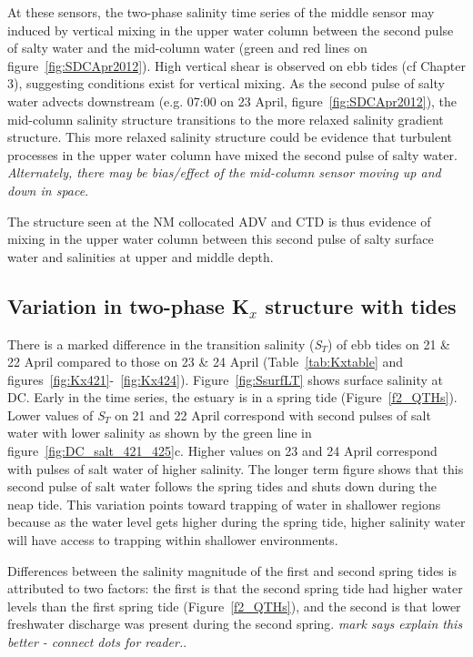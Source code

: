 At these sensors, the two-phase salinity time series of the middle sensor may induced by vertical mixing in the upper water column between the second pulse of salty water and the mid-column water (green and red lines on figure~\ref{fig:SDCApr2012}). High vertical shear is observed on ebb tides (cf Chapter 3), suggesting conditions exist for vertical mixing. As the second pulse of salty water advects downstream (e.g. 07:00 on 23 April, figure~\ref{fig:SDCApr2012}), the mid-column salinity structure transitions to the more relaxed salinity gradient structure. This more relaxed salinity structure could be evidence that turbulent processes in the upper water column have mixed the second pulse of salty water.  \emph{Alternately, there may be bias/effect of the mid-column sensor moving up and down in space}.  

The structure seen at the NM collocated ADV and CTD is thus evidence of mixing in the upper water column between this second pulse of salty surface water and salinities at upper and middle depth.

\subsection{Variation in two-phase K$_x$ structure with tides}
There is a marked difference in the transition salinity (\emph{S$_T$}) of ebb tides on 21 \& 22 April compared to those on 23 \& 24 April (Table~\ref{tab:Kxtable} and figures~\ref{fig:Kx421}-~\ref{fig:Kx424}). Figure~\ref{fig:SsurfLT} shows surface salinity at DC. Early in the time series, the estuary is in a spring tide (Figure~\ref{f2_QTHs}). Lower values of \emph{S$_T$} on 21 and 22 April correspond with second pulses of salt water with lower salinity as shown by the green line in figure~\ref{fig:DC_salt_421_425}c. Higher values on 23 and 24 April correspond with pulses of salt water of higher salinity. The longer term figure shows that this second pulse of salt water follows the spring tides and shuts down during the neap tide. This variation points toward trapping of water in shallower regions because as the water level gets higher during the spring tide, higher salinity water will have access to trapping within shallower environments.

Differences between the salinity magnitude of the first and second spring tides is attributed to two factors: the first is that the second spring tide had higher water levels than the first spring tide (Figure~\ref{f2_QTHs}), and the second is that lower freshwater discharge was present during the second spring.  \emph{mark says explain this better - connect dots for reader.}. 

